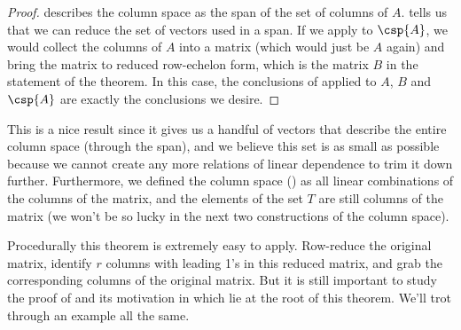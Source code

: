 %
\begin{proof}
 describes the column space as the span of the set of columns of $A$.   tells us that we can reduce the set of vectors used in a span.  If we apply  to $\csp{A}$, we would collect the columns of $A$ into a matrix (which would just be $A$ again) and bring the matrix to reduced row-echelon form, which is the matrix $B$ in the statement of the theorem.  In this case, the conclusions of  applied to $A$,  $B$ and $\csp{A}$ are exactly the conclusions we desire.
%
\end{proof}
%
This is a nice result since it gives us a handful of vectors that describe the entire column space (through the span), and we believe this set is as small as possible because we cannot create any more relations of linear dependence to trim it down further.  Furthermore, we defined the column space () as all linear combinations of the columns of the matrix, and the elements of the set $T$ are still columns of the matrix (we won't be so lucky in the next two constructions of the column space).\par
%
Procedurally this theorem is extremely easy to apply.  Row-reduce the original matrix, identify $r$ columns with leading 1's in this reduced matrix, and grab the corresponding columns of the original matrix.  But it is still important to study the proof of  and its motivation in  which lie at the root of this theorem.  We'll trot through an example all the same.
%
